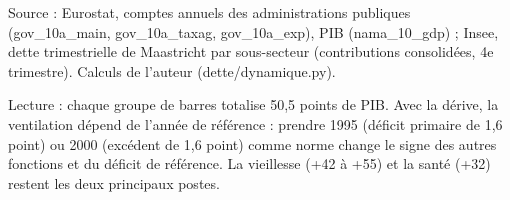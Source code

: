 Source : Eurostat, comptes annuels des administrations publiques (gov\_10a\_main, gov\_10a\_taxag, gov\_10a\_exp), PIB (nama\_10\_gdp) ; Insee, dette trimestrielle de Maastricht par sous-secteur (contributions consolidées, 4e trimestre). Calculs de l'auteur (dette/dynamique.py).\par Lecture : chaque groupe de barres totalise 50,5 points de PIB. Avec la dérive, la ventilation dépend de l'année de référence : prendre 1995 (déficit primaire de 1,6 point) ou 2000 (excédent de 1,6 point) comme norme change le signe des autres fonctions et du déficit de référence. La vieillesse (+42 à +55) et la santé (+32) restent les deux principaux postes.

